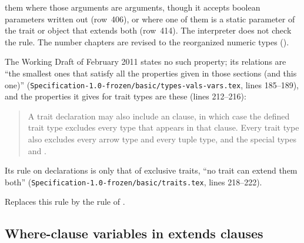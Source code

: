 \begin{description}
them where those arguments are  arguments, though it accepts boolean parameters written out (row~406),
or where one of them is a static parameter of the trait or object that extends both (row~414).
The interpreter does not check the rule.
The number chapters are revised to the reorganized numeric types
().
\item[Original text] The Working Draft of February 2011 states no such
property; its relations are ``the smallest ones that satisfy all the
properties given in those sections (and this one)''
(\nolinkurl{Specification-1.0-frozen/basic/types-vals-vars.tex}, lines
185--189), and the properties it gives for trait types are these (lines
212--216):
\begin{quote}
A trait declaration may also include an  clause,
in which case the defined trait type
excludes every type that appears in that clause.
Every trait type also excludes every arrow type and every tuple type,
and the special types \TYP{()} and .
\end{quote}
Its rule on declarations is only that of exclusive traits,
``no trait can extend them both''
(\nolinkurl{Specification-1.0-frozen/basic/traits.tex}, lines 218--222).
\item[Route C] Replaces this rule by the rule of .
\end{description}

\subsection{Where-clause variables in extends clauses}

